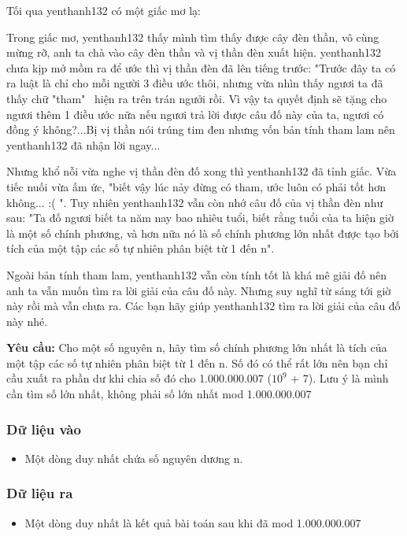 



   Tối qua   yenthanh132   có một giấc mơ lạ:  

Trong giấc mơ, yenthanh132 thấy mình tìm thấy được cây đèn thần, vô cùng mừng rỡ, anh ta chà vào cây đèn thần và vị thần đèn xuất hiện. yenthanh132 chưa kịp mở mồm ra để ước thì vị thần đèn đã lên tiếng trước: "Trước đây ta có ra luật là chỉ cho mỗi người 3 điều ước thôi, nhưng vừa nhìn thấy ngươi ta đã thấy chữ "tham"  hiện ra trên trán ngưởi rồi. Vì vậy ta quyết định sẽ tặng cho ngươi thêm 1 điều ước nữa nếu ngươi trả lời được câu đố này của ta, ngươi có đồng ý không?...Bị vị thần nói trúng tim đen nhưng vốn bản tính tham lam nên yenthanh132 đã nhận lời ngay...

   Nhưng khổ nỗi vừa nghe vị thần đèn đố xong thì   yenthanh132   đã tỉnh giấc. Vừa tiếc nuối vừa ấm ức, "biết vậy lúc nảy đừng có tham, ước luôn có phải tốt hơn không... :( ". Tuy nhiên   yenthanh132   vẫn còn nhớ câu đố của vị thần đèn như sau: "Ta đố ngươi biết ta năm nay bao nhiêu tuổi, biết rằng tuổi của ta hiện giờ là một số chính phương, và hơn nữa nó là số chính phương lớn nhất được tạo bởi tích của một tập các số tự nhiên phân biệt từ 1 đến n".  

   Ngoài bản tính tham lam,   yenthanh132   vẫn còn tính tốt là khá mê giải đố nên anh ta vẫn muốn tìm ra lời giải của câu đố này. Nhưng suy nghĩ từ sáng tới giờ này rồi mà vẫn chưa ra. Các bạn hãy giúp   yenthanh132   tìm ra lời giải của câu đố này nhé.  

\textbf{    Yêu cầu:   }   Cho một số nguyên n, hãy tìm số chính phương lớn nhất là tích của một tập các số tự nhiên phân biệt từ 1 đến n. Số đó có thể rất lớn nên bạn chỉ cầu xuất ra phần dư khi chia số đó cho 1.000.000.007 ($10^{9}$   + 7). Lưu ý là mình cần tìm số lớn nhất, không phải số lớn nhất mod 1.000.000.007  

\subsubsection{   Dữ liệu vào  }
\begin{itemize}
	\item     Một dòng duy nhất chứa số nguyên dương n.   
\end{itemize}

\subsubsection{   Dữ liệu ra  }
\begin{itemize}
	\item     Một dòng duy nhất là kết quả bài toán sau khi đã mod 1.000.000.007   
\end{itemize}


